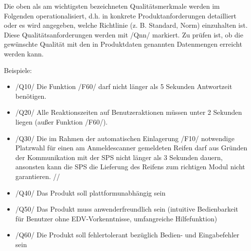 Die oben als am wichtigsten bezeichneten Qualitätsmerkmale werden im Folgenden
operationalisiert, d.h. in konkrete Produktanforderungen detailliert oder es
wird angegeben, welche Richtlinie (z. B. Standard, Norm) einzuhalten ist. Diese
Qualitätsanforderungen werden mit /Qnn/ markiert. Zu prüfen ist, ob die
gewünschte Qualität mit den in Produktdaten genannten Datenmengen erreicht
werden kann.



Beispiele:

\begin{itemize}

\item  /Q10/ Die Funktion /F60/ darf nicht länger als 5 Sekunden Antwortzeit
benötigen.
\item  /Q20/ Alle Reaktionszeiten auf Benutzeraktionen müssen unter 2 Sekunden
liegen (außer Funktion /F60/).
\item  /Q30/ Die im Rahmen der automatischen Einlagerung /F10/ notwendige
Platzwahl für einen am Anmeldescanner gemeldeten Reifen darf aus Gründen der
Kommunikation mit der SPS nicht länger als 3 Sekunden dauern, ansonsten kann
die SPS die Lieferung des Reifens zum richtigen Modul nicht garantieren. //
\item  /Q40/ Das Produkt soll plattformunabhängig sein
\item  /Q50/ Das Produkt muss anwenderfreundlich sein (intuitive Bedienbarkeit
für Benutzer ohne EDV-Vorkenntnisse, umfangreiche Hilfefunktion)
\item  /Q60/ Die Produkt soll fehlertolerant bezüglich Bedien- und
Eingabefehler sein

\end{itemize}
